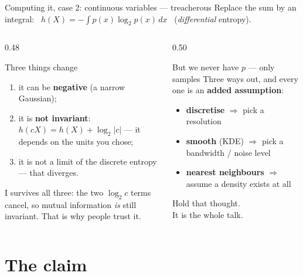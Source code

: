 \documentclass[aspectratio=169,11pt]{beamer}
\newcommand{\I}{\mathrm{I}}
\begin{document}
\begin{frame}{Computing it, case 2: continuous variables --- treacherous}
Replace the sum by an integral: \ $h(X)=-\int p(x)\log_2 p(x)\,dx$ \ (\emph{differential} entropy).
\medskip
\begin{columns}[T]
\begin{column}{0.48\textwidth}
\begin{alertblock}{Three things change}
\footnotesize
\begin{enumerate}
  \item it can be \textbf{negative} (a narrow Gaussian);
  \item it is \textbf{not invariant}: $h(cX)=h(X)+\log_2|c|$ --- it depends on the
        units you chose;
  \item it is not a limit of the discrete entropy --- that diverges.
\end{enumerate}
\end{alertblock}
\footnotesize
$\I$ survives all three: the two $\log_2 c$ terms cancel, so mutual information
\emph{is} still invariant. That is why people trust it.
\end{column}
\begin{column}{0.50\textwidth}
\begin{block}{But we never have $p$ --- only samples}
\footnotesize
Three ways out, and every one is an \textbf{added assumption}:
\begin{itemize}
  \item \textbf{discretise} $\Rightarrow$ pick a resolution
  \item \textbf{smooth} (KDE) $\Rightarrow$ pick a bandwidth / noise level
  \item \textbf{nearest neighbours} $\Rightarrow$ assume a density exists at all
\end{itemize}
\end{block}
\medskip
\centering
\footnotesize\textcolor{bad}{Hold that thought.}\\ It is the whole talk.
\end{column}
\end{columns}
\end{frame}

\section{The claim}
\end{document}
